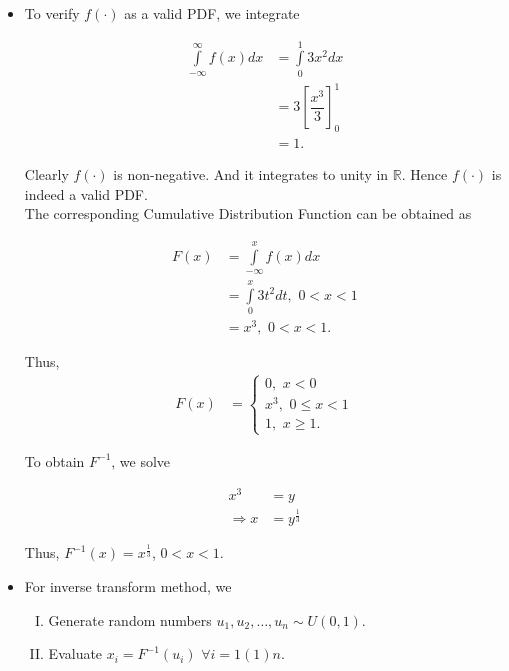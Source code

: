 \documentclass[11pt, a4paper]{article}\usepackage[]{graphicx}\usepackage[]{xcolor}
\begin{document}
\begin{itemize}
\item[\scalebox{2.0}{\twemoji{keycap: 1}}] \hspace{0.1cm} To verify $f(\cdot)$ as a valid PDF, we integrate 

\begin{align*}
\int \limits_{-\infty}^{\infty} f(x) dx &= \int \limits_{0}^{1} 3x^2 dx \\[0.2em]
&= 3 \left[ \dfrac{x^3}{3} \right]_{0}^{1} \\[0.2em]
&= 1.
\end{align*}

Clearly $f(\cdot)$ is non-negative. And it integrates to unity in $\mathbb{R}$. Hence $f(\cdot)$ is indeed a valid PDF. \\[0.3em]

The corresponding Cumulative Distribution Function can be obtained as

\begin{align*}
F(x) &= \int \limits_{-\infty}^{x} f(x) dx \\[0.3em]
&= \int \limits_{0}^{x} 3t^2 dt, \,\, 0 < x < 1 \\[0.3em]
&= x^3, \,\, 0 < x < 1.
\end{align*}

Thus,
\begin{align*}
F(x) &= \begin{cases}
          0, \,\, x < 0 \\[0.2em]
          x^3, \,\, 0 \leq x < 1 \\[0.2em]
          1, \,\, x \geq 1.
        \end{cases}
\end{align*}

To obtain $F^{-1}$, we solve

\begin{align*}
x^3 &= y \\[0.2em]
\Rightarrow x &= y^{\frac{1}{3}}
\end{align*}

Thus, $F^{-1}(x) = x^{\frac{1}{3}}$, $0 < x < 1$.

\item[\scalebox{2.0}{\twemoji{keycap: 2}}] \hspace{0.1cm} For inverse transform method, we 

\begin{enumerate}[I.]
\item Generate random numbers $u_1, u_2, \ldots, u_n \sim U(0, 1)$.
\item Evaluate $x_i = F^{-1}(u_i) \,\, \forall i = 1(1)n$.
\end{enumerate}
\end{itemize}
\end{document}
